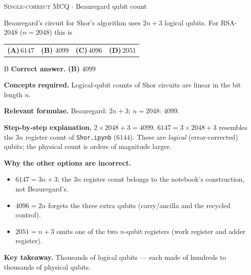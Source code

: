 \documentclass[11pt,a4paper]{article}
\newcommand{\optlabel}[1]{\textbf{(#1)}}
\newcommand{\correctlabel}[1]{\textcolor{okgreen}{\textbf{(#1)}\,\ding{51}}}
\newenvironment{qitem}[1]{\begin{list}{}{\setlength{\leftmargin}{3.3em}\setlength{\labelwidth}{3.1em}%
  \setlength{\labelsep}{0.2em}\setlength{\topsep}{3pt}\setlength{\parsep}{3pt}}\item[\textbf{Q.#1}\hfill]}{\end{list}}
\newcommand{\qsep}{\par\vspace{2pt}{\color{black!15}\hrule}\vspace{4pt}}
\newcommand{\qmeta}[2]{{\footnotesize\color{black!60}\textsc{#1} \;$\cdot$\; #2}\par}
\begin{document}
\begin{qitem}{61}
\qmeta{Single-correct MCQ}{Beauregard qubit count}
Beauregard's circuit for Shor's algorithm uses $2n + 3$ logical qubits. For RSA-2048 ($n = 2048$) this is
\par\smallskip\noindent\begin{tabularx}{\linewidth}{@{}*{4}{L}@{}}
\optlabel{A}\,$6147$ & \correctlabel{B}\,$4099$ & \optlabel{C}\,$4096$ & \optlabel{D}\,$2051$
\end{tabularx}
\end{qitem}
\begin{solbox}{B}
\textbf{\color{brand}Correct answer.} \textcolor{okgreen}{\textbf{(B)}} $4099$

\textbf{\color{brand}Concepts required.} Logical-qubit counts of Shor circuits are linear in the bit length $n$.

\textbf{\color{brand}Relevant formulae.} Beauregard: $2n + 3$; $n = 2048$: $4099$.

\textbf{\color{brand}Step-by-step explanation.} $2\times2048 + 3 = 4099$. $6147 = 3\times2048 + 3$ resembles the $3n$ register count of \texttt{Shor.ipynb} ($6144$). These are \emph{logical}
(error-corrected) qubits; the physical count is orders of magnitude larger.

\textbf{\color{brand}Why the other options are incorrect.}
\begin{itemize}[leftmargin=2.4em, itemsep=1pt, topsep=2pt]
\item[\textbf{(A)}] $6147 = 3n + 3$; the $3n$ register count belongs to the notebook's construction, not Beauregard's.
\item[\textbf{(C)}] $4096 = 2n$ forgets the three extra qubits (carry/ancilla and the recycled control).
\item[\textbf{(D)}] $2051 = n + 3$ omits one of the two $n$-qubit registers (work register and adder register).
\end{itemize}
\textbf{\color{brand}Key takeaway.} Thousands of logical qubits --- each made of hundreds to thousands of physical qubits.
\end{solbox}
\qsep
\end{document}
